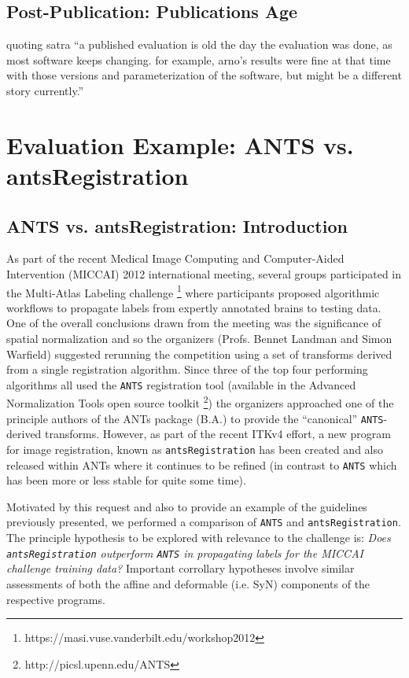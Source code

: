 \documentclass[final,5p,times,twocolumn]{elsarticle}
\begin{document}
\subsection{Post-Publication: Publications Age}

quoting satra ``a published evaluation is old the day the evaluation was done, as most software keeps changing. for example, arno's results were fine at that time with those versions and parameterization of the software, but might be a different story currently.''

\section{Evaluation Example:  ANTS vs. antsRegistration}

\subsection{ANTS vs. antsRegistration:  Introduction}
As part of the recent Medical Image Computing and Computer-Aided Intervention 
(MICCAI) 2012 international meeting, several groups participated in the 
Multi-Atlas Labeling challenge%
\footnote{
https://masi.vuse.vanderbilt.edu/workshop2012
}
where participants proposed algorithmic workflows to propagate
labels from expertly annotated brains to testing data.  One of 
the overall conclusions drawn from the meeting was the significance 
of spatial normalization and so the organizers (Profs. Bennet Landman and Simon
Warfield) suggested rerunning the competition using a set
of transforms derived from a single registration algorithm.
Since three of the top four performing algorithms all used
the \verb#ANTS# registration tool \cite{avants2011} (available
in the Advanced Normalization Tools open source 
toolkit%
\footnote{
http://picsl.upenn.edu/ANTS
}) the organizers approached one of the principle authors of
the ANTs package (B.A.) to provide the ``canonical'' 
\verb#ANTS#-derived transforms.  
However, as part of the recent ITKv4 effort, a new
program for image registration, known as \verb#antsRegistration#
has been created and also released within ANTs \cite{avants2012}
where it continues to be refined (in contrast to \verb#ANTS# which
has been more or less stable for quite some time).

Motivated by this request and also to provide an example of the 
guidelines previously presented, we performed a comparison of 
 \verb#ANTS# and \verb#antsRegistration#.  The principle hypothesis
 to be explored with relevance to the challenge is:  {\it Does
 \verb#antsRegistration# outperform \verb#ANTS# in propagating
 labels for the MICCAI challenge training data?}  Important 
 corrollary hypotheses involve similar assessments of both the
 affine and deformable (i.e. SyN) components of the respective
 programs.
 
\end{document}
